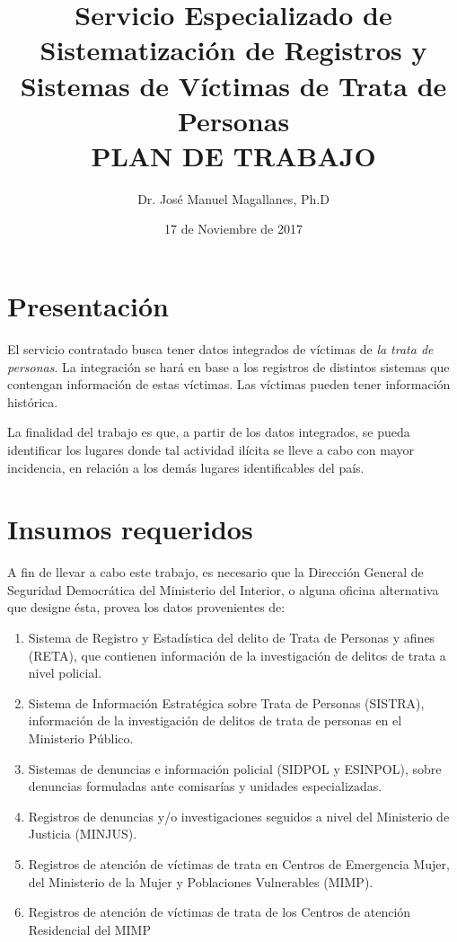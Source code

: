 \documentclass{article}
\title{Servicio Especializado de Sistematizaci\'{o}n de Registros y Sistemas de V\'{i}ctimas de Trata de Personas\\
\vspace{200px}
{\bf PLAN DE TRABAJO}}
\author{\vspace{75px}Dr. Jos\'{e} Manuel Magallanes, Ph.D}
\date{17 de Noviembre de 2017}
\begin{document}

\maketitle
\thispagestyle{empty}

\clearpage
\setcounter{page}{1}
\section{Presentaci\'{o}n}

El servicio contratado busca tener datos integrados de v\'{i}ctimas de \emph{la trata de personas}.   La integraci\'{o}n se har\'{a} en base a los registros de distintos sistemas que contengan informaci\'{o}n de estas v\'{i}ctimas. Las v\'{i}ctimas pueden tener informaci\'{o}n hist\'{o}rica.

La finalidad del trabajo es que, a partir de los datos integrados, se pueda identificar los lugares donde tal actividad il\'{i}cita se lleve a cabo con mayor incidencia, en relaci\'{o}n a los dem\'{a}s lugares identificables del pa\'{i}s. 

\section{Insumos requeridos}

A fin de llevar a cabo este trabajo, es necesario que la Dirección General de Seguridad Democr\'{a}tica del Ministerio del Interior, o alguna oficina alternativa que designe \'{e}sta, provea los datos provenientes de:

\begin{enumerate}
\item Sistema de Registro y Estad\'{i}stica del delito de Trata de Personas y afines (RETA), que contienen informaci\'{o}n de la investigaci\'{o}n de delitos de trata a nivel policial.  

\item Sistema de Informaci\'{o}n Estrat\'{e}gica sobre Trata de Personas (SISTRA), informaci\'{o}n de la investigaci\'{o}n de delitos de trata de personas en el Ministerio P\'{u}blico.

\item Sistemas de denuncias e informaci\'{o}n policial (SIDPOL y ESINPOL), sobre denuncias formuladas ante comisar\'{i}as y unidades especializadas.

\item Registros  de denuncias y/o investigaciones seguidos a nivel del Ministerio de Justicia (MINJUS).

\item Registros de atenci\'{o}n de v\'{i}ctimas de trata en Centros de Emergencia Mujer, del Ministerio de la Mujer y Poblaciones Vulnerables (MIMP).

\item Registros de atenci\'{o}n de v\'{i}ctimas de trata de los Centros de atenci\'{o}n Residencial del MIMP
\end{enumerate}
\end{document}
